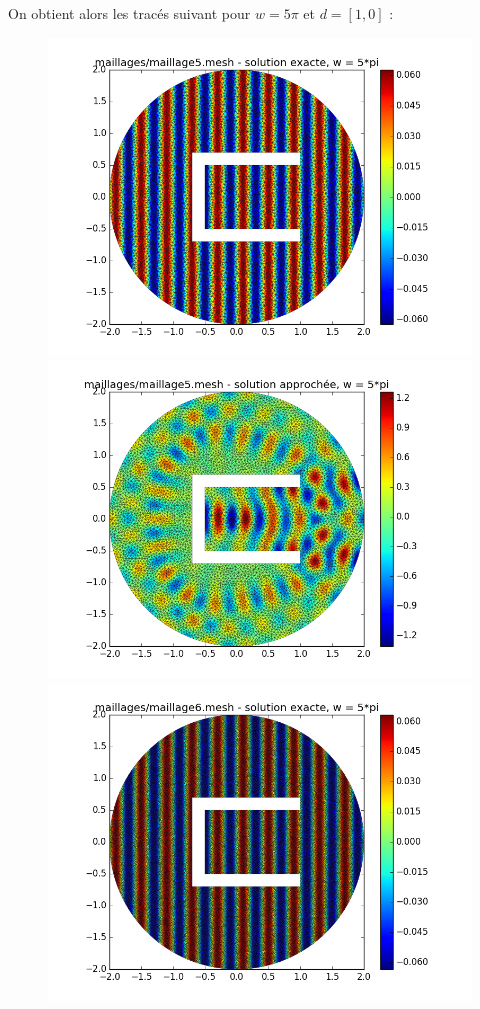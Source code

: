 \documentclass[a4paper,12pt]{article}
\begin{document}
On obtient alors les tracés suivant pour $w = 5\pi$ et $d = [1,0]$ :
\begin{figure}[H]
\begin{center}
        \includegraphics[scale = 0.3]{image/5Pi/figure_5}
        \includegraphics[scale = 0.3]{image/5Pi/figure_5-5}
        \includegraphics[scale = 0.3]{image/5Pi/figure_6}

\end{center}
\end{figure}
\end{document}
